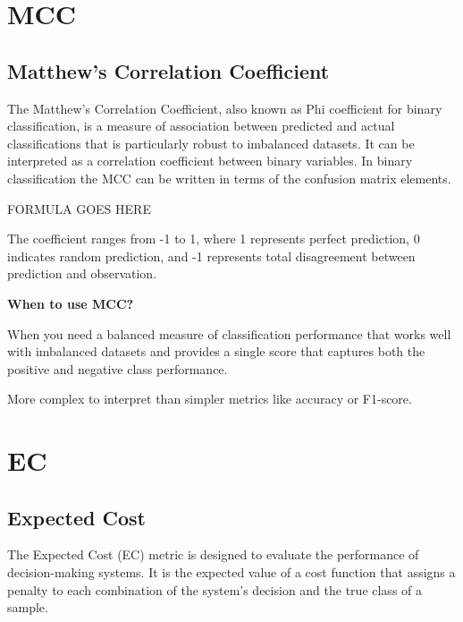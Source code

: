\clearpage
\thispagestyle{classificationstyle}
\section{MCC}
\subsection{Matthew's Correlation Coefficient}

The Matthew's Correlation Coefficient, also known as Phi coefficient for binary classification, is a measure of association between predicted and actual classifications
that is particularly robust to imbalanced datasets. It can be interpreted as a correlation coefficient between binary variables. In binary classification the MCC can
be written in terms of the confusion matrix elements.

% 
FORMULA GOES HERE
% 

The coefficient ranges from -1 to 1, where 1 represents perfect prediction, 0 indicates random prediction, and -1 represents total disagreement between prediction and
observation.

\textbf{When to use MCC?}

When you need a balanced measure of classification performance that works well with imbalanced datasets and provides a single score that captures both the positive and
negative class performance.

{
    \item More complex to interpret than simpler metrics like accuracy or F1-score.
}


\clearpage
\thispagestyle{classificationstyle}
\section{EC}
\subsection{Expected Cost}

The Expected Cost (EC) metric is designed to evaluate the performance of decision-making systems. It is the expected value of a cost function that assigns a penalty to each combination of the system's decision and the true class of a sample. 

